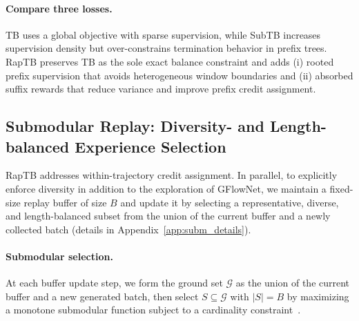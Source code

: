\documentclass{article}
\theoremstyle{plain}
\theoremstyle{definition}
\theoremstyle{remark}
\begin{document}
\paragraph{Compare three losses.}
TB uses a global objective with sparse supervision, while SubTB increases supervision density but over-constrains termination behavior in prefix trees.
RapTB preserves TB as the sole exact balance constraint and adds (i) rooted prefix supervision that avoids heterogeneous window boundaries and (ii) absorbed suffix rewards that reduce variance and improve prefix credit assignment. 


\subsection{Submodular Replay: Diversity- and Length-balanced Experience Selection}
\label{sec:submodreplay}

RapTB addresses within-trajectory credit assignment.
In parallel, to explicitly enforce diversity in addition to the exploration of GFlowNet,
we maintain a fixed-size replay buffer of size $B$ and update it by selecting a representative, diverse, and length-balanced subset from the union of the current buffer and a newly collected batch (details in Appendix~\ref{app:subm_details}).

\paragraph{Submodular selection.}
At each buffer update step, we form the ground set $\mathcal{G}$ as the union of the current buffer and a new generated batch, then select $S\subseteq\mathcal{G}$ with $|S|=B$ by maximizing a monotone submodular function subject to a cardinality constraint~\citep{subM_bg1, subM_bg2, subM_bg3}.
\end{document}
